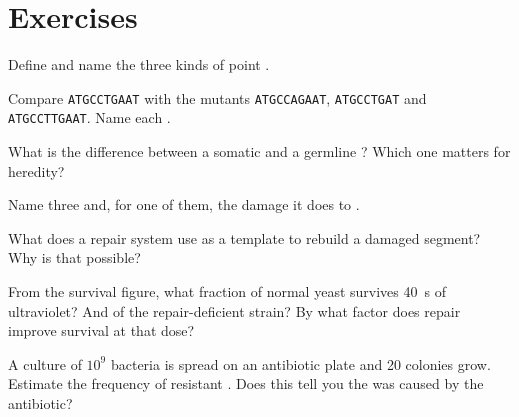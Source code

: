 \section{Exercises}

\begin{exercise}[$\star$]\label{exo:g11:mutations:1}
Define  and name the three kinds of point .
\end{exercise}

\begin{exercise}[$\star$]\label{exo:g11:mutations:2}
Compare \texttt{ATGCCTGAAT} with the mutants \texttt{ATGCCAGAAT},
\texttt{ATGCCTGAT} and \texttt{ATGCCTTGAAT}. Name each .
\end{exercise}

\begin{exercise}[$\star$]\label{exo:g11:mutations:3}
What is the difference between a somatic and a germline ?
Which one matters for heredity?
\end{exercise}

\begin{exercise}[$\star$]\label{exo:g11:mutations:4}
Name three  and, for one of them, the damage it does to .
\end{exercise}

\begin{exercise}[$\star$]\label{exo:g11:mutations:5}
What does a repair system use as a template to rebuild a damaged
segment? Why is that possible?
\end{exercise}

\begin{exercise}[$\star\star$]\label{exo:g11:mutations:6}
From the survival figure, what fraction of normal yeast survives
\qty{40}{s} of ultraviolet? And of the repair-deficient strain? By
what factor does repair improve survival at that dose?
\end{exercise}

\begin{exercise}[$\star\star$]\label{exo:g11:mutations:7}
A culture of $10^9$ bacteria is spread on an antibiotic plate and 20
colonies grow. Estimate the frequency of resistant . Does this
tell you the  was caused by the antibiotic?
\end{exercise}

